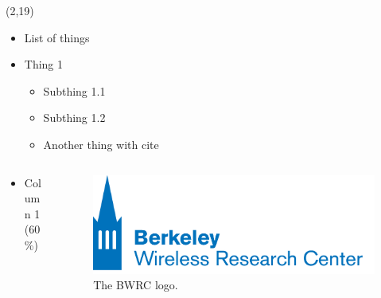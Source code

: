 \documentclass[final]{beamer}
\begin{document}
\begin{frame}{}
  \renewcommand{\baselinestretch}{1}

  \begin{textblock}{32}(2,19)
    \vspace{0.5cm}

    \begin{itemize}
      \setlength\itemsep{0.5em}
      \item List of things
      \item Thing 1
      \begin{itemize}
        \item Subthing 1.1
        \item Subthing 1.2
        \item Another thing with cite \cite{wattch}
      \end{itemize}
    \end{itemize}

    \begin{columns}
      \hfill
      \begin{column}{0.6\linewidth}
        \begin{itemize}
          \setlength\itemsep{0.5em}
          \item Column 1 (60\%)
        \end{itemize}
      \end{column}
      \begin{column}{0.35\linewidth}
        \begin{figure}
          \centering
          \includegraphics[width=\linewidth,trim={0cm, 0cm, 0cm, 0cm}, clip]{figs/bwrc_logo.png}
          \caption*{The BWRC logo.}
          \label{fig:threads}
        \end{figure}
      \end{column}
    \end{columns}

    \vspace{1cm}
    \vspace{0.5cm}


\end{textblock}
\end{frame}
\end{document}
